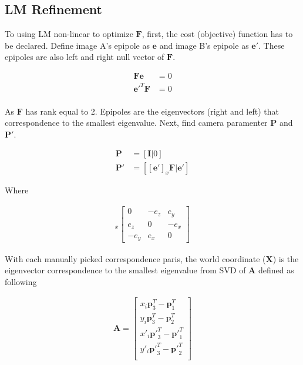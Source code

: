 \documentclass[11pt]{article}
\begin{document}
\subsection*{LM Refinement}

To using LM non-linear to optimize $\mathbf{F}$, first, the cost (objective) function has to be declared. Define image A's epipole as $\mathbf{e}$ and image B's epipole as $\mathbf{e'}$. These epipoles are also left and right null vector of $\mathbf{F}$.  

\begin{align*}
\mathbf{F}\mathbf{e} &= 0 \\
\mathbf{e'}^T\mathbf{F} &= 0 \\
\end{align*}

As  $\mathbf{F}$ has rank equal to 2. Epipoles are the eigenvectors (right and left) that correspondence to the smallest eigenvalue. Next, find camera paramenter  $\mathbf{P}$ and  $\mathbf{P'}$. 

\begin{align*}
\mathbf{P} &= [\mathbf{I}|0]  \\
\mathbf{P'} &= [[\mathbf{e'}]_x\mathbf{F}|\mathbf{e'}] 
\end{align*}

Where 

\begin{align*}
[\mathbf{e'}]_x
\begin{bmatrix} 
0 & -e_z & e_y  \\ 
e_z & 0 & -e_x \\ 
-e_y & e_x & 0
\end{bmatrix}
\end{align*}

With each manually picked correspondence paris, the world coordinate ($\mathbf{X}$) is the eigenvector correspondence to the smallest eigenvalue from SVD of $\mathbf{A}$ defined as following

\begin{align*}
\mathbf{A} = 
\begin{bmatrix} 
x_i \mathbf{p}^T_3 - \mathbf{p}^T_1   \\ 
y_i \mathbf{p}^T_3 - \mathbf{p}^T_2   \\ 
x'_i \mathbf{p'}^T_3 - \mathbf{p'}^T_1   \\ 
y'_i \mathbf{p'}^T_3 - \mathbf{p'}^T_2   \\ 
\end{bmatrix}
\end{align*}
\end{document}
